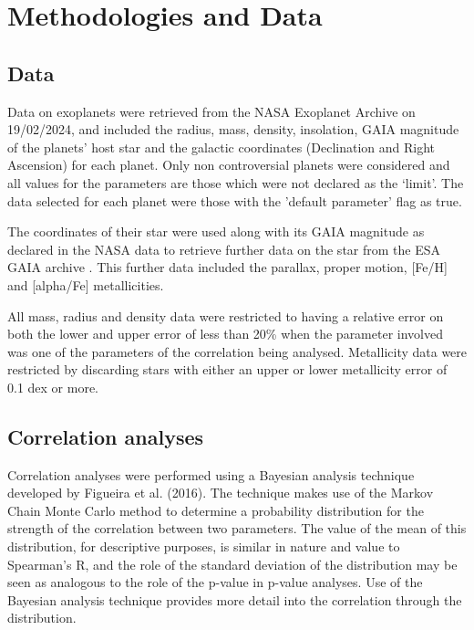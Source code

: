 \documentclass[a4paper,twocolumn,12pt]{article}
\begin{document}


\section{Methodologies and Data}
\subsection{Data}
Data on exoplanets were retrieved from the NASA Exoplanet Archive \cite{NASA Exoplanet Archive} on 19/02/2024, and included the radius, mass, density, insolation, GAIA magnitude of the planets' host star and the galactic coordinates (Declination and Right Ascension) for each planet. Only non controversial planets were considered and all values for the parameters are those which were not declared as the `limit'. The data selected for each planet were those with the 'default parameter' flag as true.

The coordinates of their star were used along with its GAIA magnitude as declared in the NASA data to retrieve further data on the star from the ESA GAIA archive \cite{GAIA Archive}. This further data included the parallax, proper motion, [Fe/H] and [alpha/Fe] metallicities.

All mass, radius and density data were restricted to having a relative error on both the lower and upper error of less than 20\% when the parameter involved was one of the parameters of the correlation being analysed. Metallicity data were restricted by discarding stars with either an upper or lower metallicity error of 0.1 dex or more.

\subsection{Correlation analyses}
\label{subsection: Linear Correlation Analysis}
Correlation analyses were performed using a Bayesian analysis technique developed by Figueira et al. (2016)\cite{Figueira}. The technique makes use of the Markov Chain Monte Carlo method to determine a probability distribution for the strength of the correlation between two parameters. The value of the mean of this distribution, for descriptive purposes, is similar in nature and value to Spearman's R, and the role of the standard deviation of the distribution may be seen as analogous to the role of the p-value in p-value analyses. Use of the Bayesian analysis technique provides more detail into the correlation through the distribution.
\end{document}
